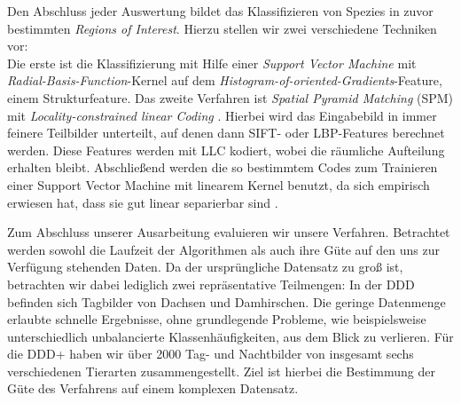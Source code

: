 Den Abschluss jeder Auswertung bildet das Klassifizieren von Spezies in zuvor bestimmten \emph{Regions of Interest}. Hierzu stellen wir zwei verschiedene Techniken vor: \\
Die erste ist die Klassifizierung mit Hilfe einer \emph{Support Vector Machine} mit \emph{Radial-Basis-Function}-Kernel auf dem \emph{Histogram-of-oriented-Gradients}-Feature, einem Strukturfeature. 
Das zweite Verfahren ist \emph{Spatial Pyramid Matching} (SPM) mit \emph{Locality-constrained linear Coding} \cite{lsp06}. Hierbei wird das Eingabebild in immer feinere Teilbilder unterteilt, auf denen dann SIFT- oder LBP-Features berechnet werden. Diese Features werden mit LLC kodiert, wobei die räumliche Aufteilung erhalten bleibt. Abschließend werden die so bestimmtem Codes zum Trainieren einer Support Vector Machine mit linearem Kernel benutzt, da sich empirisch erwiesen hat, dass sie gut linear separierbar sind \cite{yygh09}. 

Zum Abschluss unserer Ausarbeitung evaluieren wir unsere Verfahren. Betrachtet werden sowohl die Laufzeit der Algorithmen als auch ihre Güte auf den uns zur Verfügung stehenden Daten. Da der ursprüngliche Datensatz zu groß ist, betrachten wir dabei lediglich zwei repräsentative Teilmengen:
In der DDD befinden sich Tagbilder von Dachsen und Damhirschen. Die geringe Datenmenge erlaubte schnelle Ergebnisse, ohne grundlegende Probleme, wie beispielsweise unterschiedlich unbalancierte Klassenhäufigkeiten, aus dem Blick zu verlieren.
Für die DDD+ haben wir über 2000 Tag- und Nachtbilder von insgesamt sechs verschiedenen Tierarten zusammengestellt. Ziel ist hierbei die Bestimmung der Güte des Verfahrens auf einem komplexen Datensatz.
